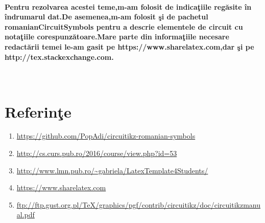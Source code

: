 \documentclass[12pt,twoside]{report}
\numberwithin{figure}{section}
\begin{document}
		\paragraph{Pentru rezolvarea acestei teme,m-am folosit de indica\c{t}iile reg\u{a}site \^{i}n \^{i}ndrumarul dat.De asemenea,m-am folosit \c{s}i de pachetul romanianCircuitSymbols pentru a descrie elementele de circuit cu nota\c{t}iile corespunz\u{a}toare.Mare parte din informa\c{t}iile necesare redact\u{a}rii temei le-am gasit pe https://www.sharelatex.com,dar \c{s}i pe http://tex.stackexchange.com.}
		\\
		\vspace{1cm}
	
	
	
	\section*{Referin\c{t}e}
	\begin{enumerate}
	\item \url{https://github.com/PopAdi/circuitikz-romanian-symbols}
	\item \url{http://cs.curs.pub.ro/2016/course/view.php?id=53}
	\item \url{http://www.lmn.pub.ro/~gabriela/LatexTemplate4Students/}
	\item \url{https://www.sharelatex.com}
	\item \url{ftp://ftp.gust.org.pl/TeX/graphics/pgf/contrib/circuitikz/doc/circuitikzmanual.pdf}
	
	\end{enumerate}		
	
	
	
	
	\endpage
	
	
\end{document}
